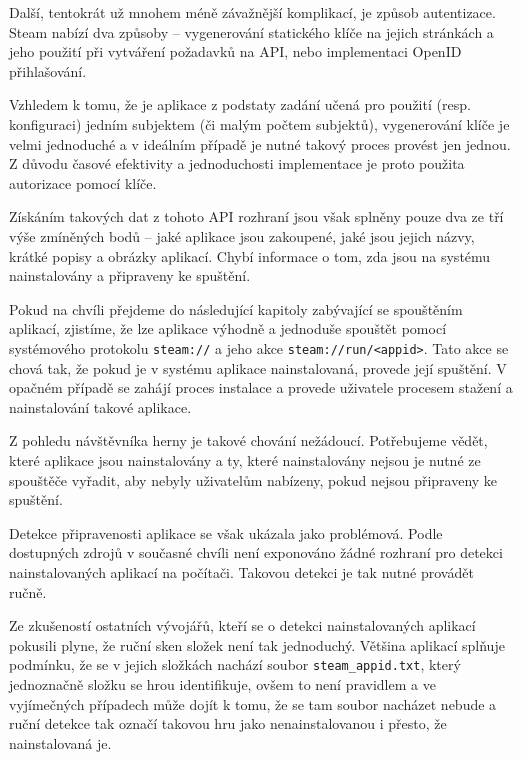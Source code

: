 Další, tentokrát už mnohem méně závažnější komplikací, je způsob
autentizace. Steam nabízí dva způsoby
-- vygenerování statického klíče na jejich stránkách a jeho použití
při vytváření požadavků na API, nebo implementaci OpenID přihlašování. \autocite{swadocs}

Vzhledem k tomu, že je aplikace z podstaty zadání učená pro použití
(resp. konfiguraci) jedním subjektem (či malým počtem subjektů),
vygenerování klíče je velmi jednoduché a v ideálním případě je nutné
takový proces provést jen jednou. Z důvodu časové efektivity a 
jednoduchosti implementace je proto použita autorizace pomocí klíče.

Získáním takových dat z tohoto API rozhraní jsou však splněny pouze dva
ze tří výše zmíněných bodů -- jaké aplikace jsou zakoupené, jaké jsou
jejich názvy, krátké popisy a obrázky aplikací. Chybí informace o tom,
zda jsou na systému nainstalovány a připraveny ke spuštění.

Pokud na chvíli přejdeme do následující kapitoly zabývající se
spouštěním aplikací, zjistíme, že lze aplikace výhodně a jednoduše
spouštět pomocí systémového protokolu \texttt{steam://} a jeho akce
\texttt{steam://run/\textless{}appid\textgreater{}}. Tato akce se chová
tak, že pokud je v systému aplikace nainstalovaná, provede její
spuštění. V opačném případě se zahájí proces instalace a provede
uživatele procesem stažení a nainstalování takové aplikace. 

Z pohledu návštěvníka herny je takové chování nežádoucí. Potřebujeme
vědět, které aplikace jsou nainstalovány a ty, které nainstalovány
nejsou je nutné ze spouštěče vyřadit, aby nebyly uživatelům nabízeny,
pokud nejsou připraveny ke spuštění.

Detekce připravenosti aplikace se však ukázala jako
problémová. Podle dostupných zdrojů v současné chvíli není exponováno
žádné rozhraní pro detekci nainstalovaných aplikací na počítači. 
Takovou detekci je tak nutné provádět ručně. 

Ze zkušeností ostatních vývojářů, kteří se o detekci nainstalovaných aplikací pokusili
plyne, že ruční sken složek není tak jednoduchý. \autocite{hardgamedetection} Většina aplikací splňuje
podmínku, že se v jejich složkách nachází soubor
\texttt{steam\_appid.txt}, který jednoznačně složku se hrou
identifikuje, ovšem to není pravidlem a ve vyjímečných případech může
dojít k tomu, že se tam soubor nacházet nebude a ruční detekce tak 
označí takovou hru jako nenainstalovanou i přesto, že nainstalovaná je.

